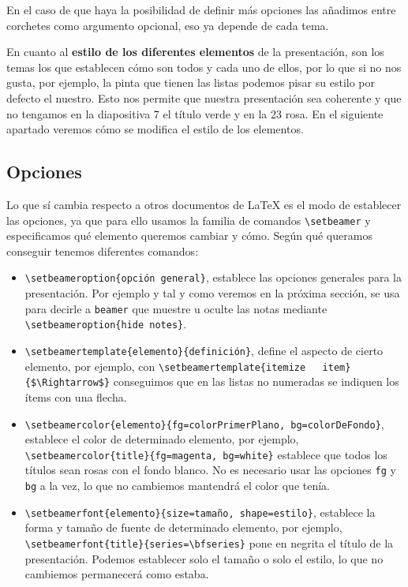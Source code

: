 En el caso de que haya la posibilidad de definir más opciones las
añadimos entre corchetes como argumento opcional, eso ya depende de cada
tema.

En cuanto al \textbf{estilo de los diferentes elementos} de la
presentación, son los temas los que establecen cómo son todos y cada uno
de ellos, por lo que si no nos gusta, por ejemplo, la pinta que tienen
las listas podemos pisar su estilo por defecto el nuestro. Esto nos
permite que nuestra presentación sea coherente y que no tengamos en la
diapositiva 7 el título verde y en la 23 rosa. En el siguiente apartado
veremos cómo se modifica el estilo de los elementos.

\subsection{Opciones}

Lo que sí cambia respecto a otros documentos de LaTeX es el modo de
establecer las opciones, ya que para ello usamos la familia de comandos
\lstinline!\setbeamer! y especificamos qué elemento queremos cambiar y
cómo. Según qué queramos conseguir tenemos diferentes comandos:

\begin{itemize}
\item
  \lstinline!\setbeameroption{opción general}!, establece las opciones
  generales para la presentación. Por ejemplo y tal y como veremos en la
  próxima sección, se usa para decirle a \lstinline!beamer! que muestre
  u oculte las notas mediante \lstinline!\setbeameroption{hide notes}!.
\item
  \lstinline!\setbeamertemplate{elemento}{definición}!, define el
  aspecto de cierto elemento, por ejemplo, con
  \lstinline!\setbeamertemplate{itemize   item}{$\Rightarrow$}!
  conseguimos que en las listas no numeradas se indiquen los ítems con
  una flecha.
\item
  \lstinline!\setbeamercolor{elemento}{fg=colorPrimerPlano, bg=colorDeFondo}!,
  establece el color de determinado elemento, por ejemplo,
  \lstinline!\setbeamercolor{title}{fg=magenta, bg=white}! establece que
  todos los títulos sean rosas con el fondo blanco. No es necesario usar
  las opciones \lstinline!fg! y \lstinline!bg! a la vez, lo que no
  cambiemos mantendrá el color que tenía.
\item
  \lstinline!\setbeamerfont{elemento}{size=tamaño, shape=estilo}!,
  establece la forma y tamaño de fuente de determinado elemento, por
  ejemplo, \lstinline!\setbeamerfont{title}{series=\bfseries}! pone en
  negrita el título de la presentación. Podemos establecer solo el
  tamaño o solo el estilo, lo que no cambiemos permanecerá como estaba.
\end{itemize}

